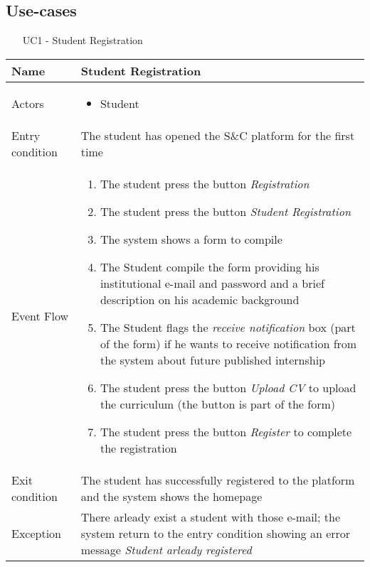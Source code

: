 			
			
		\subsection{Use-cases}
			
			\begin{table} [H]
				\centering
				\begin{itemize}
					\item [UC1] - Student Registration
				\end{itemize}
				\begin{tabular}{|| P{7.5cm} | P{7.5cm} ||}
					\hline
					Name & Student Registration \\
					\hline
					Actors & \parbox{5cm}{\begin{itemize}
							\item Student
							\end{itemize}
						} \\
					\hline
					Entry condition & The student has opened the S\&C platform for the first time \\
					\hline
					Event Flow & \parbox{5cm}{\begin{enumerate}[label=\alpha]
						\item The student press the button \textit{Registration}
						\item The student press the button \textit{Student Registration}
						\item The system shows a form to compile
						\item The Student compile the form providing his institutional e-mail and password and a brief description on his academic 
						background
						\item The Student flags the \textit{receive 
						notification} box (part of the form) 
						if he wants to receive notification 
						from the system about future 
						published internship 
						\item The student press the button 
						\textit{Upload CV} to upload the 
						curriculum (the button is part of 
						the form)
						\item The student press the button 
						\textit{Register} to complete the 
						registration
						\end{enumerate}} \\
					\hline 
					Exit condition & The student has successfully registered 
					to the platform and the system shows the 
					homepage \\
					\hline
					Exception & There arleady exist a student with 
					those e-mail; the system return to 
					the entry condition showing an 
					error message \textit{Student arleady 
					registered} \\
					\hline
				\end{tabular}
			\end{table}
			
